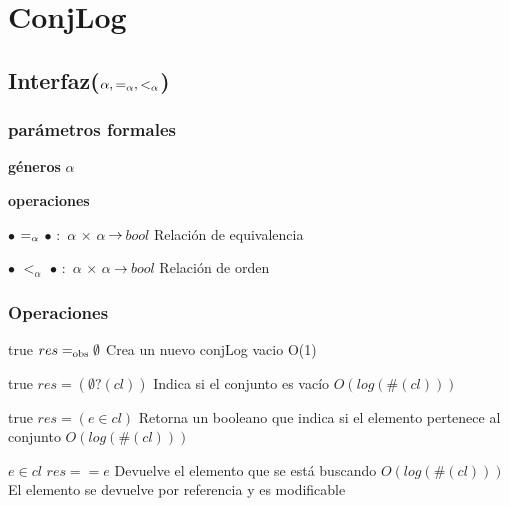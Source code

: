 \section{ConjLog}

\subsection{Interfaz($\alpha, \igsub{\alpha}, <_\alpha$)}

	\subsubsection{parámetros formales}
	\begin{description}[labelindent=1cm]
	\item[] \textbf{g\'eneros} $\alpha$
	\item[] \textbf{operaciones} 
			\begin{description}[labelindent=1cm] 
			\item[] $\bullet$ $\igsub{\alpha}$ $\bullet$ $:$ $\alpha$ $\times$ $\alpha$ $\!\rightarrow\!$ $bool$ \indent Relación de equivalencia
			\item[] $\bullet$ $<_\alpha$ $\bullet$ $:$ $\alpha$ $\times$ $\alpha$ $\!\rightarrow\!$ $bool$	\indent Relación de orden
			\end{description}
	\end{description}
	


\subsubsection*{Operaciones}

{true}
{$res =_{\mathrm{obs}} \emptyset$}
{Crea un nuevo conjLog vacio}
{O(1)}
{}

{true}
{$res = (\emptyset?(cl))$}
{Indica si el conjunto es vacío}
{$O(log(\#(cl)))$}
{}

{true}
{$res = (e \in cl)$}
{Retorna un booleano que indica si el elemento pertenece al conjunto}
{$O(log(\#(cl)))$}
{}

{$e \in cl$}
{$res == e$}
{Devuelve el elemento que se está buscando}
{$O(log(\#(cl)))$}
{El elemento se devuelve por referencia y es modificable}

